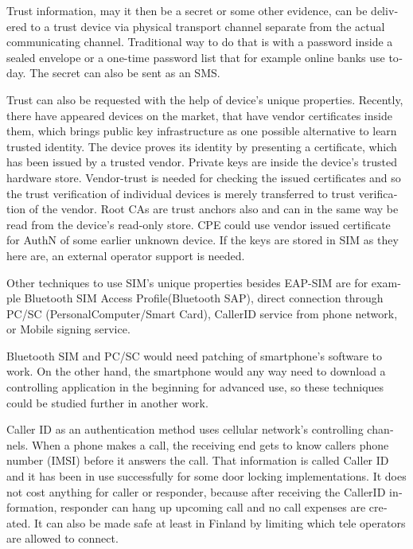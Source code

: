 \documentclass[12pt,a4paper,english]{tutthesis}
\begin{document}
\begin{otherlanguage}{english}
 Trust information, may it then be a secret or some
other evidence, can be delivered to a trust device via physical
transport channel separate from the actual communicating channel.
Traditional way to do that is with a password inside a sealed
envelope or a one-time password list that for example online banks 
use today. The secret can also be sent as an SMS.

Trust can also be requested with the help of device's
unique properties. Recently, there have appeared  devices on the market, that
have vendor certificates inside them, which brings public key
infrastructure as one possible alternative to learn trusted identity. 
The device proves its identity by presenting a certificate, which has
been issued by a trusted vendor.  Private keys are inside the device's
trusted hardware store. Vendor-trust is needed for checking the issued certificates
and so the trust verification of individual devices is merely
transferred to trust verification of the vendor.  Root CAs are trust anchors
also and can in the same way be read from the device's read-only store.
CPE could use vendor issued certificate for AuthN of some earlier
unknown device.  If the keys are stored in SIM as they here are, an
external operator support is needed.



Other techniques  to use SIM's unique properties besides EAP-SIM
are for example Bluetooth SIM Access Profile(Bluetooth  SAP), 
direct connection through PC/SC (Personal\-Computer/Smart\- Card),
CallerID service from phone network, or
Mobile signing service.



Bluetooth SIM and PC/SC would need patching of smartphone's software
to work.  On the other hand, the smartphone would any way need to
download  a controlling application
in the beginning for advanced use, so these techniques could be
studied further in another work.

Caller ID as an authentication method uses cellular network's controlling
channels. When a phone makes a call, the receiving end gets 
to know callers phone number (IMSI) before it answers the call.
That information is called Caller ID and it has been in use
successfully for some door locking implementations. 
It does not cost anything for caller or responder,
because after receiving the CallerID  information, responder can hang
up upcoming call and no call expenses are created.
 It can also be made safe at least in Finland
by limiting which tele operators are allowed to connect.

















\end{otherlanguage}
\end{document}
